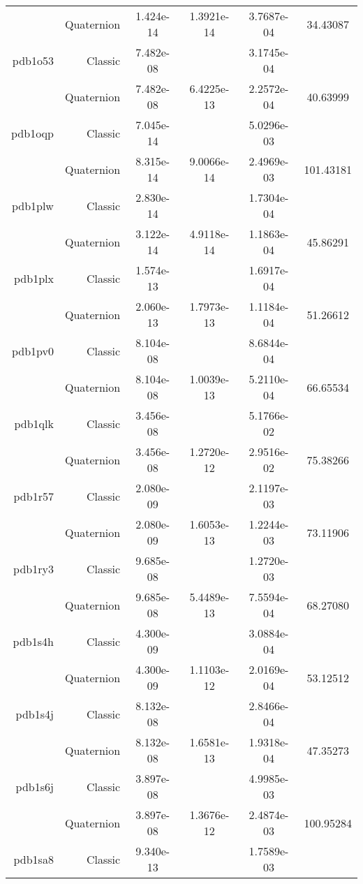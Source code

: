 \begin{xltabular}{\textwidth}{r|rS[table-format=1.3e+2]S[table-format=1.4e+2]S[table-format=1.4e+2]S[table-format=-1.5]}
& Quaternion & 1.424e-14 & 1.3921e-14 & 3.7687e-04 & 34.43087\\  \addlinespace
pdb1o53 & Classic & 7.482e-08 &  & 3.1745e-04 & \\
& Quaternion & 7.482e-08 & 6.4225e-13 & 2.2572e-04 & 40.63999\\  \addlinespace
pdb1oqp & Classic & 7.045e-14 &  & 5.0296e-03 & \\
& Quaternion & 8.315e-14 & 9.0066e-14 & 2.4969e-03 & 101.43181\\  \addlinespace
pdb1plw & Classic & 2.830e-14 &  & 1.7304e-04 & \\
& Quaternion & 3.122e-14 & 4.9118e-14 & 1.1863e-04 & 45.86291\\  \addlinespace
pdb1plx & Classic & 1.574e-13 &  & 1.6917e-04 & \\
& Quaternion & 2.060e-13 & 1.7973e-13 & 1.1184e-04 & 51.26612\\  \addlinespace
pdb1pv0 & Classic & 8.104e-08 &  & 8.6844e-04 & \\
& Quaternion & 8.104e-08 & 1.0039e-13 & 5.2110e-04 & 66.65534\\  \addlinespace
pdb1qlk & Classic & 3.456e-08 &  & 5.1766e-02 & \\
& Quaternion & 3.456e-08 & 1.2720e-12 & 2.9516e-02 & 75.38266\\  \addlinespace
pdb1r57 & Classic & 2.080e-09 &  & 2.1197e-03 & \\
& Quaternion & 2.080e-09 & 1.6053e-13 & 1.2244e-03 & 73.11906\\  \addlinespace
pdb1ry3 & Classic & 9.685e-08 &  & 1.2720e-03 & \\
& Quaternion & 9.685e-08 & 5.4489e-13 & 7.5594e-04 & 68.27080\\  \addlinespace
pdb1s4h & Classic & 4.300e-09 &  & 3.0884e-04 & \\
& Quaternion & 4.300e-09 & 1.1103e-12 & 2.0169e-04 & 53.12512\\  \addlinespace
pdb1s4j & Classic & 8.132e-08 &  & 2.8466e-04 & \\
& Quaternion & 8.132e-08 & 1.6581e-13 & 1.9318e-04 & 47.35273\\  \addlinespace
pdb1s6j & Classic & 3.897e-08 &  & 4.9985e-03 & \\
& Quaternion & 3.897e-08 & 1.3676e-12 & 2.4874e-03 & 100.95284\\  \addlinespace
pdb1sa8 & Classic & 9.340e-13 &  & 1.7589e-03 & \\

\end{xltabular}
